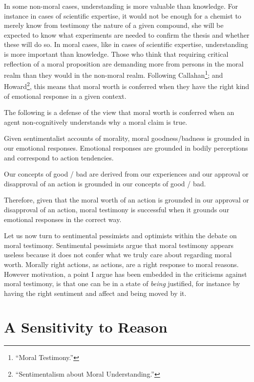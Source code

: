 \documentclass[phdthesis,12pt,final,a4paper]{wuthesis}
\theoremstyle{definition}
\theoremstyle{definition}
\theoremstyle{definition}
\theoremstyle{definition}
\theoremstyle{remark}
\begin{document}
In some non-moral cases, understanding is more valuable than knowledge. For instance in cases of scientific expertise, it would not be enough for a chemist to merely know from testimony the nature of a given compound, she will be expected to know what experiments are needed to confirm the thesis and whether these will do so. In moral cases, like in cases of scientific expertise, understanding is more important than knowledge. Those who think that requiring critical reflection of a moral proposition are demanding more from persons in the moral realm than they would in the non-moral realm. Following Callahan\footnote{{``Moral {Testimony}.''}}; and Howard\footnote{{``Sentimentalism about {Moral Understanding}.''}}, this means that moral worth is conferred when they have the right kind of emotional response in a given context.

The following is a defense of the view that moral worth is conferred when an agent non-cognitively understands why a moral claim is true.

Given sentimentalist accounts of morality, moral goodness/badness is grounded in our emotional responses. Emotional responses are grounded in bodily perceptions and correspond to action tendencies.

Our concepts of good / bad are derived from our experiences and our approval or disapproval of an action is grounded in our concepts of good / bad.

Therefore, given that the moral worth of an action is grounded in our approval or disapproval of an action, moral testimony is successful when it grounds our emotional responses in the correct way.

Let us now turn to sentimental pessimists and optimists within the debate on moral testimony. Sentimental pessimists argue that moral testimony appears useless because it does not confer what we truly care about regarding moral worth. Morally right actions, as actions, are a right response to moral reasons. However motivation, a point I argue has been embedded in the criticisms against moral testimony, is that one can be in a state of \emph{being} justified, for instance by having the right sentiment and affect and being moved by it.

\section{A Sensitivity to Reason}\label{a-sensitivity-to-reason}
\end{document}
